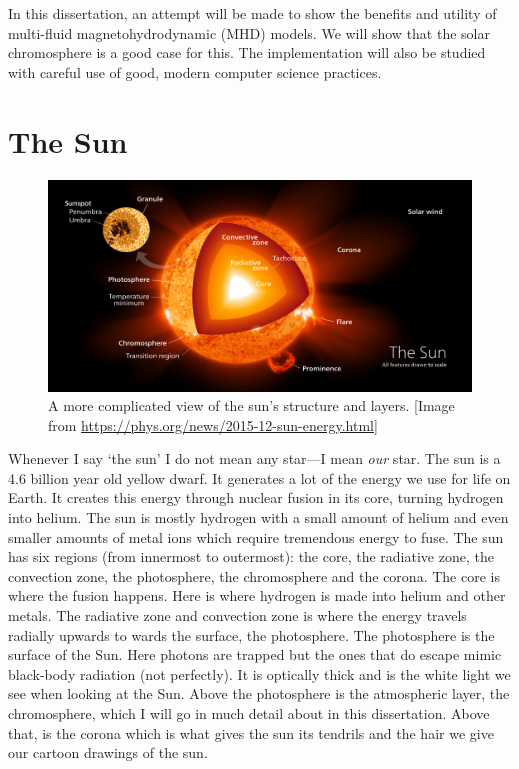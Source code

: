 \documentclass[12pt,upcase]{umlthesis}
\begin{document}
In this dissertation, an attempt will be made to show the benefits and utility of multi-fluid magnetohydrodynamic (MHD) models. We will show that the solar chromosphere is a good case for this. The implementation will also be studied with careful use of good, modern computer science practices.

\section{The Sun}

\begin{figure}[h!]\label{fig:sunstructure}
	\centering
	\includegraphics[width=1.0\linewidth]{images/sunstructure.png}
	\caption{A more complicated view of the sun's structure and layers. [{Image from \url{https://phys.org/news/2015-12-sun-energy.html}}]} %
\end{figure}

Whenever I say `the sun' I do not mean any star---I mean \textit{our} star. The sun is a 4.6 billion year old yellow dwarf. It generates a lot of the energy we use for life on Earth. It creates this energy through nuclear fusion in its core, turning hydrogen into helium. The sun is mostly hydrogen with a small amount of helium and even smaller amounts of metal ions which require tremendous energy to fuse. The sun has six regions (from innermost to outermost): the core, the radiative zone, the convection zone, the photosphere, the chromosphere and the corona. The core is where the fusion happens. Here is where hydrogen is made into helium and other metals. The radiative zone and convection zone is where the energy travels radially upwards to wards the surface, the photosphere. The photosphere is the surface of the Sun. Here photons are trapped but the ones that do escape mimic black-body radiation (not perfectly). It is optically thick and is the white light we see when looking at the Sun. Above the photosphere is the atmospheric layer, the chromosphere, which I will go in much detail about in this dissertation. Above that, is the corona which is what gives the sun its tendrils and the hair we give our cartoon drawings of the sun.
\end{document}
